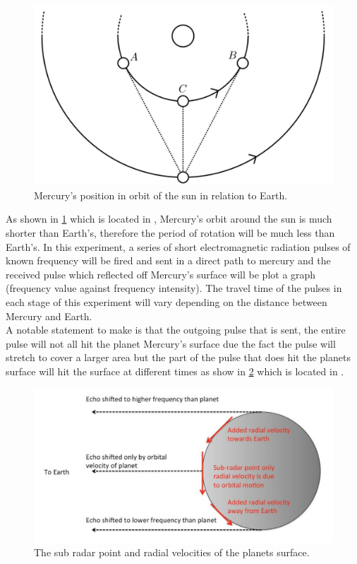 \documentclass[11pt]{article}
\begin{document}
\begin{multicols}{2}
\begin{figure}[H]
\centering
\includegraphics[scale=0.18]{Planetary_Positions.png}
\caption{Mercury's position in orbit of the sun in relation to Earth.}
\label{Planetary Positions}
\end{figure}

As shown in \cref{Planetary Positions} which is located in \cite{LLR.1-2018}, Mercury's orbit around the sun is much shorter than Earth's, therefore the period of rotation will be much less than Earth's. In this experiment, a series of short electromagnetic radiation pulses of known frequency will be fired and sent in a direct path to mercury and the received pulse which reflected off Mercury's surface will be plot a graph (frequency value against frequency intensity). The travel time of the pulses in each stage of this experiment will vary depending on the distance between Mercury and Earth. \\

A notable statement to make is that the outgoing pulse that is sent, the entire pulse will not all hit the planet Mercury's surface due the fact the pulse will stretch to cover a larger area but the part of the pulse that does hit the planets surface will hit the surface at different times as show in \cref{Planet freq target} which is located in \cite{LLR.1-2018}. \\

\begin{figure}[H]
\centering
\includegraphics[scale=0.25]{Planet_freq_target.png}
\caption{The sub radar point and radial velocities of the planets surface.}
\label{Planet freq target}
\end{figure}


\end{multicols}
\end{document}
